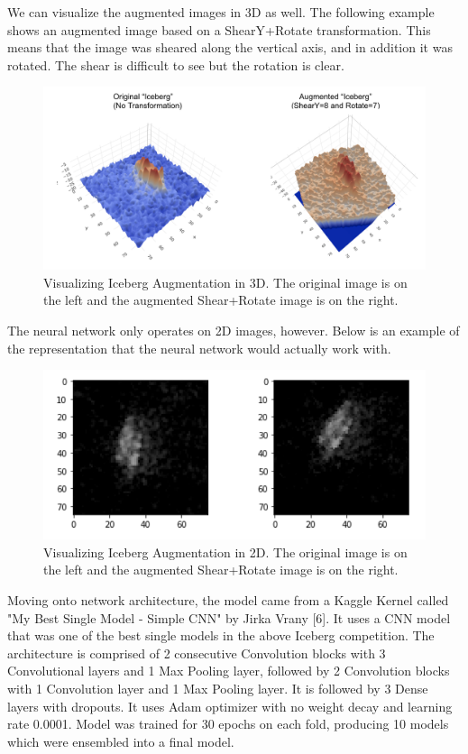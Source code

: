 \documentclass[10pt,twocolumn,letterpaper]{article}
\begin{document}
We can visualize the augmented images in 3D as well.  The following example shows an augmented image based on a ShearY+Rotate transformation.  This means that the image was sheared along the vertical axis, and in addition it was rotated.  The shear is difficult to see but the rotation is clear.

\begin{figure}[bhp]
\includegraphics[width=\columnwidth]{iceberg_aug_example.png}
\caption{Visualizing Iceberg Augmentation in 3D.  The original image is on the left and the augmented Shear+Rotate image is on the right.}
\end{figure}

The neural network only operates on 2D images, however.  Below is an example of the representation that the neural network would actually work with.

\begin{figure}[bhp]
\includegraphics[width=\columnwidth]{iceberg_aug_2d_example.png}
\caption{Visualizing Iceberg Augmentation in 2D.  The original image is on the left and the augmented Shear+Rotate image is on the right.}
\end{figure}

Moving onto network architecture, the model came from a Kaggle Kernel called "My Best Single Model - Simple CNN" by Jirka Vrany [6].  It uses a CNN model that was one of the best single models in the above Iceberg competition. The architecture is comprised of 2 consecutive Convolution blocks with 3 Convolutional layers and 1 Max Pooling layer, followed by 2 Convolution blocks with 1 Convolution layer and 1 Max Pooling layer. It is followed by 3 Dense layers with dropouts. It uses Adam optimizer with no weight decay and learning rate 0.0001. Model was trained for 30 epochs on each fold, producing 10 models which were ensembled into a final model.  
\end{document}
